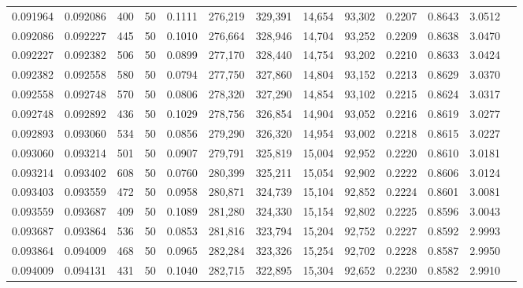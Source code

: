 \begin{tabular}{rrrrrrrrrrrrr}
0.091964 & 0.092086 &   400 &  50 &                                     0.1111 & 276,219 & 329,391 &  14,654 &  93,302 & 0.2207 & 0.8643 & 3.0512 \\
0.092086 & 0.092227 &   445 &  50 &                                     0.1010 & 276,664 & 328,946 &  14,704 &  93,252 & 0.2209 & 0.8638 & 3.0470 \\
0.092227 & 0.092382 &   506 &  50 &                                     0.0899 & 277,170 & 328,440 &  14,754 &  93,202 & 0.2210 & 0.8633 & 3.0424 \\
0.092382 & 0.092558 &   580 &  50 &                                     0.0794 & 277,750 & 327,860 &  14,804 &  93,152 & 0.2213 & 0.8629 & 3.0370 \\
0.092558 & 0.092748 &   570 &  50 &                                     0.0806 & 278,320 & 327,290 &  14,854 &  93,102 & 0.2215 & 0.8624 & 3.0317 \\
0.092748 & 0.092892 &   436 &  50 &                                     0.1029 & 278,756 & 326,854 &  14,904 &  93,052 & 0.2216 & 0.8619 & 3.0277 \\
0.092893 & 0.093060 &   534 &  50 &                                     0.0856 & 279,290 & 326,320 &  14,954 &  93,002 & 0.2218 & 0.8615 & 3.0227 \\
0.093060 & 0.093214 &   501 &  50 &                                     0.0907 & 279,791 & 325,819 &  15,004 &  92,952 & 0.2220 & 0.8610 & 3.0181 \\
0.093214 & 0.093402 &   608 &  50 &                                     0.0760 & 280,399 & 325,211 &  15,054 &  92,902 & 0.2222 & 0.8606 & 3.0124 \\
0.093403 & 0.093559 &   472 &  50 &                                     0.0958 & 280,871 & 324,739 &  15,104 &  92,852 & 0.2224 & 0.8601 & 3.0081 \\
0.093559 & 0.093687 &   409 &  50 &                                     0.1089 & 281,280 & 324,330 &  15,154 &  92,802 & 0.2225 & 0.8596 & 3.0043 \\
0.093687 & 0.093864 &   536 &  50 &                                     0.0853 & 281,816 & 323,794 &  15,204 &  92,752 & 0.2227 & 0.8592 & 2.9993 \\
0.093864 & 0.094009 &   468 &  50 &                                     0.0965 & 282,284 & 323,326 &  15,254 &  92,702 & 0.2228 & 0.8587 & 2.9950 \\
0.094009 & 0.094131 &   431 &  50 &                                     0.1040 & 282,715 & 322,895 &  15,304 &  92,652 & 0.2230 & 0.8582 & 2.9910 \\

\end{tabular}
